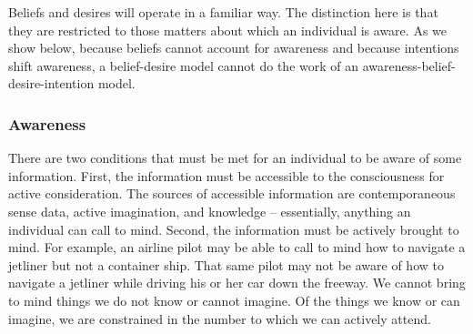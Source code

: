 \documentclass[
11pt,
titlepage,
reqno,
]{article}%
\theoremstyle{definition}
\begin{document}
	Beliefs and desires will operate in a familiar way. 
	The distinction here is that they are restricted to those matters about which an individual is aware.
	As we show below, because beliefs cannot account for awareness and because intentions shift awareness, a belief-desire model cannot do the work of an awareness-belief-desire-intention model.



	 
	 

	 \subsubsection{Awareness}

There are two conditions that must be met for an individual to be aware of some information. 
First, the information must be accessible to the consciousness for active consideration. 
The sources of accessible information are contemporaneous sense data, active imagination, and knowledge -- essentially, anything an individual can call to mind. 
Second, the information must be actively brought to mind. 
For example, an airline pilot may be able to call to mind how to navigate a jetliner but not a container ship. 
That same pilot may not be aware of how to navigate a jetliner while driving his or her car down the freeway. 
We cannot bring to mind things we do not know or cannot imagine.
Of the things we know or can imagine, we are constrained in the number to which we can actively attend. 
\end{document}
